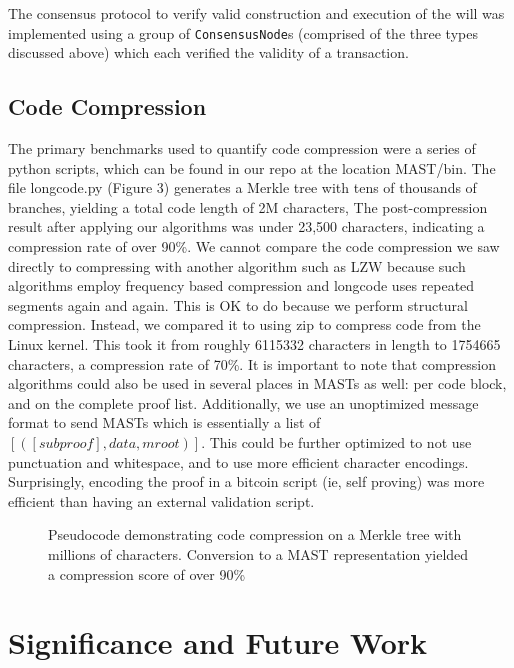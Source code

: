 \documentclass{vldb}
\begin{document}
The consensus protocol to verify valid construction and execution of the will
was implemented using a group of \texttt{ConsensusNode}s (comprised of the three types
discussed above) which each verified the validity of a transaction.

\subsection{Code Compression}

The primary benchmarks used to quantify code compression were a series of
python scripts, which can be found in our repo at the location MAST/bin. The
file longcode.py (Figure 3) generates a Merkle tree with tens of thousands of
branches, yielding a total code length of 2M characters, The post-compression
result after applying our algorithms was under 23,500 characters, indicating a
compression rate of over 90\%. We cannot compare the code compression we saw
directly to compressing with another algorithm such as LZW because such
algorithms employ frequency based compression and longcode uses repeated
segments again and again. This is OK to do because we perform structural
compression. Instead, we compared it to using zip to compress code from the Linux kernel.
This took it from roughly 6115332 characters in length to 1754665 characters, a
compression rate of 70\%. It is important to note that compression algorithms
could also be used in several places in MASTs as well: per code block, and on
the complete proof list. Additionally, we use an unoptimized message format to send
MASTs which is essentially a list of $[([subproof],data, mroot) ]$. This could be
further optimized to not use punctuation and whitespace, and to use more
efficient character encodings. Surprisingly, encoding the proof in a bitcoin
script (ie, self proving) was more efficient than having an external validation
script.
\vspace{-280pt}
\begin{figure}[h]
	
	\caption{Pseudocode demonstrating code compression on a Merkle tree with millions of characters. Conversion to a MAST representation yielded a compression score of over 90\%}
           \label{code}
\end{figure}

\pagebreak
\section{Significance and Future Work}
\end{document}
